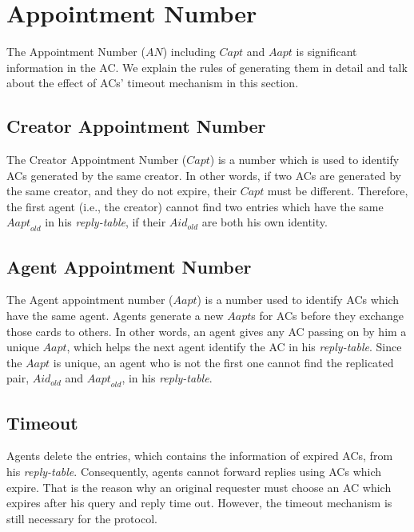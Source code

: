 \section{Appointment Number}

\noindent The Appointment Number ($AN$) including $Capt$ and $Aapt$ is significant information in the AC. We explain the rules of generating them in detail and talk about the effect of ACs' timeout mechanism in this section.


\subsection{Creator Appointment Number}

\noindent The Creator Appointment Number ($Capt$) is a number which is used to identify ACs generated by the same creator. In other words, if two ACs are generated by the same creator, and they do not expire, their $Capt$ must be different. Therefore, the first agent (i.e., the creator) cannot find two entries which have the same ${Aapt}_{old}$ in his \textit{reply-table}, if their ${Aid}_{old}$ are both his own identity.


\subsection{Agent Appointment Number}

\noindent The Agent appointment number ($Aapt$) is a number used to identify ACs which have the same agent. Agents generate a new $Aapt$s for ACs before they exchange those cards to others. In other words, an agent gives any AC passing on by him a unique $Aapt$, which helps the next agent identify the AC in his \textit{reply-table}. Since the $Aapt$ is unique, an agent who is not the first one cannot find the replicated pair, ${Aid}_{old}$ and ${Aapt}_{old}$, in his \textit{reply-table}.


\subsection{Timeout}

\noindent Agents delete the entries, which contains the information of expired ACs, from his \textit{reply-table}. Consequently, agents cannot forward replies using ACs which expire. That is the reason why an original requester must choose an AC which expires after his query and reply time out. However, the timeout mechanism is still necessary for the protocol.

